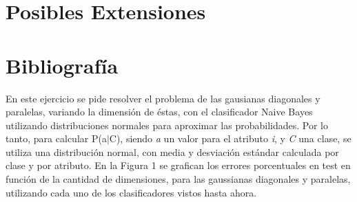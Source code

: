 \documentclass[12pt, a4paper]{article}
\begin{document}
\section*{Posibles Extensiones} 

\section*{Bibliografía}
 
 En este ejercicio se pide resolver el problema de las gausianas diagonales y paralelas, variando la dimensión de éstas, con el clasificador Naive Bayes utilizando distribuciones normales para aproximar las probabilidades. Por lo tanto, para calcular P(a$|$C), siendo \textit{a} un valor para el atributo \textit{i}, y \textit{C} una clase, se utiliza una distribución normal, con media y desviación estándar calculada por clase y por atributo. En la Figura 1 se grafican los errores porcentuales en test en función de la cantidad de dimensiones, para las gaussianas diagonales y paralelas, utilizando cada uno de los clasificadores vistos hasta ahora.
 
\end{document}
